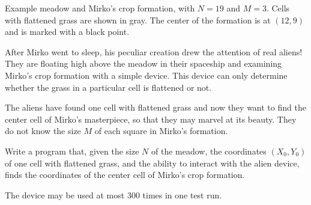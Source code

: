 Example meadow and Mirko's crop formation, with $N = 19$ and $M = 3$.
Cells with flattened grass are shown in gray. The center of the formation is at $(12, 9)$ and is marked with a black point.

After Mirko went to sleep, his peculiar creation drew the attention of real aliens! They are floating high above the meadow in their spaceship and examining Mirko's crop formation with a simple device. This device can only determine whether the grass in a particular cell is flattened or not.

The aliens have found one cell with flattened grass and now they want to find the center cell of Mirko's masterpiece, so that they may marvel at its beauty. They do not know the size $M$ of each square in Mirko's formation.

Write a program that, given the size $N$  of the meadow, the coordinates $(X_0, Y_0)$ of one cell with flattened grass, and the ability to interact with the alien device, finds the coordinates of the center cell of
Mirko's crop formation.

The device may be used at most $300$ times in one test run.